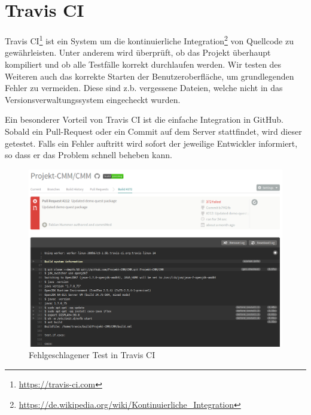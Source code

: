 

\newpage
\section{Travis CI}

Travis CI\footnote{\url{https://travis-ci.com}} ist ein System um die kontinuierliche Integration\footnote{\url{https://de.wikipedia.org/wiki/Kontinuierliche_Integration}} von Quellcode zu gew\"ahrleisten. Unter anderem wird \"uberpr\"uft, ob das Projekt \"uberhaupt kompiliert und ob alle Testf\"alle korrekt durchlaufen werden. Wir testen des Weiteren auch das korrekte Starten der Benutzeroberfl\"ache, um grundlegenden Fehler zu vermeiden. Diese sind z.b. vergessene Dateien, welche nicht in das Versionsverwaltungssystem eingecheckt wurden.

Ein besonderer Vorteil von Travis CI ist die einfache Integration in GitHub. Sobald ein Pull-Request oder ein Commit auf dem Server stattfindet, wird dieser getestet. Falls ein Fehler auftritt wird sofort der jeweilige Entwickler informiert, so dass er das Problem schnell beheben kann.

\begin{figure}[h]
\centering
\includegraphics[width=1\textwidth]{./media/images/development/travis_failed.png}
\caption{Fehlgeschlagener Test in Travis CI}
\label{development_travis_failed}
\end{figure}